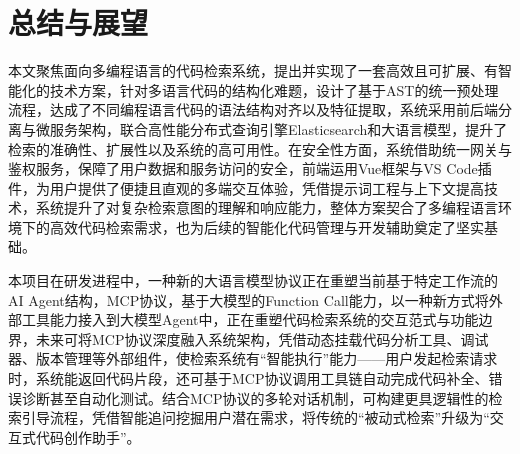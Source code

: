 \documentclass[UTF8,a4paper,12pt]{ctexart}
\numberwithin{equation}{section}
\begin{document}
\renewcommand\refname{总结与展望}
\section*{总结与展望}
本文聚焦面向多编程语言的代码检索系统，提出并实现了一套高效且可扩展、有智能化的技术方案，针对多语言代码的结构化难题，设计了基于AST的统一预处理流程，达成了不同编程语言代码的语法结构对齐以及特征提取，系统采用前后端分离与微服务架构，联合高性能分布式查询引擎Elasticsearch和大语言模型，提升了检索的准确性、扩展性以及系统的高可用性。在安全性方面，系统借助统一网关与鉴权服务，保障了用户数据和服务访问的安全，前端运用Vue框架与VS Code插件，为用户提供了便捷且直观的多端交互体验，凭借提示词工程与上下文提高技术，系统提升了对复杂检索意图的理解和响应能力，整体方案契合了多编程语言环境下的高效代码检索需求，也为后续的智能化代码管理与开发辅助奠定了坚实基础。\par
本项目在研发进程中，一种新的大语言模型协议正在重塑当前基于特定工作流的AI Agent结构，MCP协议，基于大模型的Function Call能力，以一种新方式将外部工具能力接入到大模型Agent中，正在重塑代码检索系统的交互范式与功能边界，未来可将MCP协议深度融入系统架构，凭借动态挂载代码分析工具、调试器、版本管理等外部组件，使检索系统有“智能执行”能力——用户发起检索请求时，系统能返回代码片段，还可基于MCP协议调用工具链自动完成代码补全、错误诊断甚至自动化测试。结合MCP协议的多轮对话机制，可构建更具逻辑性的检索引导流程，凭借智能追问挖掘用户潜在需求，将传统的“被动式检索”升级为“交互式代码创作助手”。\par

\newpage
{}

\renewcommand\refname{参考文献}

\end{document}
